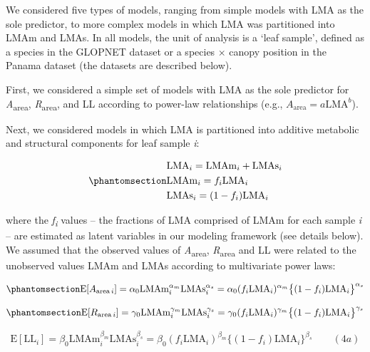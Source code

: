 \documentclass[
  12pt,
  letterpaper,
  DIV=11,
  numbers=noendperiod]{scrartcl}
\begin{document}
We considered five types of models, ranging from simple models with LMA
as the sole predictor, to more complex models in which LMA was
partitioned into LMAm and LMAs. In all models, the unit of analysis is a
`leaf sample', defined as a species in the GLOPNET dataset or a species
\(\times\) canopy position in the Panama dataset (the datasets are
described below).

First, we considered a simple set of models with LMA as the sole
predictor for \emph{A}\textsubscript{area},
\emph{R}\textsubscript{area}, and LL according to power-law
relationships (e.g., \(A_{\mathrm{area}} = a\mathrm{LMA}^b\)).

Next, we considered models in which LMA is partitioned into additive
metabolic and structural components for leaf sample \emph{i}:

\begin{equation}\phantomsection\label{eq-LMA}{
\begin{aligned}
  &\mathrm{LMA}_{i} =\mathrm{LMAm}_{i} + \mathrm{LMAs}_{i} \\
  &\mathrm{LMAm}_{i} = f_{i} \mathrm{LMA}_{i} \\
  &\mathrm{LMAs}_{i} = (1 - f_{i})  \mathrm{LMA}_{i}
\end{aligned}
}\end{equation}

where the \emph{f\textsubscript{i}} values -- the fractions of LMA
comprised of LMAm for each sample \emph{i} -- are estimated as latent
variables in our modeling framework (see details below). We assumed that
the observed values of \emph{A}\textsubscript{area},
\emph{R}\textsubscript{area} and LL were related to the unobserved
values LMAm and LMAs according to multivariate power laws:

\begin{equation}\phantomsection\label{eq-Aarea}{
\mathrm{E}[A_{\mathrm{area} \, i}]
= \alpha_0\mathrm{LMAm}_{i}^{\alpha_m}\mathrm{LMAs}_i^{\alpha_s}  =  \alpha_0 (f_i \mathrm{LMA}_{i})^{\alpha_m} \bigl\{(1-f_i) \mathrm{LMA}_{i}\bigr\}^{\alpha_s}
}\end{equation}

\begin{equation}\phantomsection\label{eq-Rarea}{
\mathrm{E}[R_{\mathrm{area} \, i}]
= \gamma_0\mathrm{LMAm}_{i}^{\gamma_m} \mathrm{LMAs}_{i}^{\gamma_s}
= \gamma_0 (f_i \mathrm{LMA}_{i})^{\gamma_m} \bigl\{(1-f_i)\mathrm{LMA}_{i}\bigr\}^{\gamma_s}
}\end{equation}

\[
\mathrm{E}[\mathrm{LL}_i] = \beta_0\mathrm{LMAm}_{i}^{\beta_m} \mathrm{LMAs}_{i}^{\beta_s}  = \beta_0 (f_i \mathrm{LMA}_{i})^{\beta_m} \bigl\{(1-f_i) \mathrm{LMA}_{i}\bigr\}^{\beta_s} \qquad(4a)
\]
\end{document}
